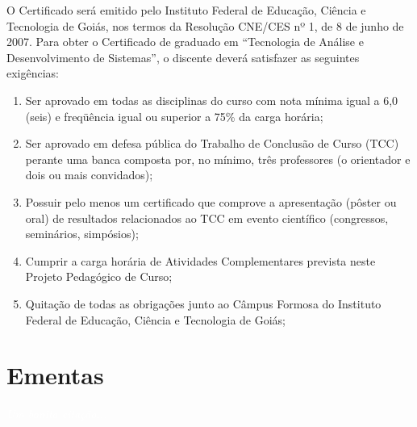 \documentclass[11pt,fleqn]{book} %
\begin{document}
O Certificado será emitido pelo Instituto Federal de Educação, Ciência e Tecnologia de Goiás, nos termos da Resolução CNE/CES nº 1, de 8 de junho de 2007.	
Para obter o Certificado de graduado em ``Tecnologia de Análise e Desenvolvimento de Sistemas'', o discente deverá satisfazer as seguintes exigências:
\begin{enumerate}
	\item Ser aprovado em todas as disciplinas do curso com nota mínima igual a 6,0 (seis) e freqüência igual ou superior a 75\% da carga horária;
	\item Ser aprovado em defesa pública do Trabalho de Conclusão de Curso (TCC) perante uma banca composta por, no mínimo, três professores (o orientador e dois ou mais convidados);
	\item Possuir pelo menos um certificado que comprove a apresentação (pôster ou oral) de resultados relacionados ao TCC em evento científico (congressos, seminários, simpósios);
	\item Cumprir a carga horária de Atividades Complementares prevista neste Projeto Pedagógico de Curso;
	\item Quitação de todas as obrigações junto ao Câmpus Formosa do Instituto Federal de Educação, Ciência e Tecnologia de Goiás;
\end{enumerate}








\chapter{Ementas}\label{ementas}
\vspace{6em}
\begin{flushright}
	\textit{\textcolor{white}{Um bonita citação...}}
\end{flushright}
\vspace{12em}

\end{document}
